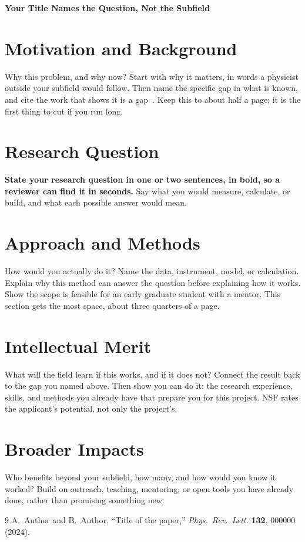 \documentclass[11pt,letterpaper]{article}
\begin{document}
\begin{center}
{\large\bfseries Your Title Names the Question, Not the Subfield}
\end{center}

\section*{Motivation and Background}
Why this problem, and why now? Start with why it matters, in words a physicist
outside your subfield would follow. Then name the specific gap in what is known,
and cite the work that shows it is a gap~\cite{example2024}. Keep this to about
half a page; it is the first thing to cut if you run long.

\section*{Research Question}
\textbf{State your research question in one or two sentences, in bold, so a
reviewer can find it in seconds.} Say what you would measure, calculate, or
build, and what each possible answer would mean.

\section*{Approach and Methods}
How would you actually do it? Name the data, instrument, model, or calculation.
Explain why this method can answer the question before explaining how it works.
Show the scope is feasible for an early graduate student with a mentor. This
section gets the most space, about three quarters of a page.


\section*{Intellectual Merit}
What will the field learn if this works, and if it does not? Connect the result
back to the gap you named above. Then show you can do it: the research
experience, skills, and methods you already have that prepare you for this
project. NSF rates the applicant's potential, not only the project's.

\section*{Broader Impacts}
Who benefits beyond your subfield, how many, and how would you know it worked?
Build on outreach, teaching, mentoring, or open tools you have already done,
rather than promising something new.

\begin{thebibliography}{9}
\setlength{\itemsep}{0pt}
A.~Author and B.~Author, ``Title of the paper,''
\textit{Phys.\ Rev.\ Lett.} \textbf{132}, 000000 (2024).
\end{thebibliography}
\end{document}
